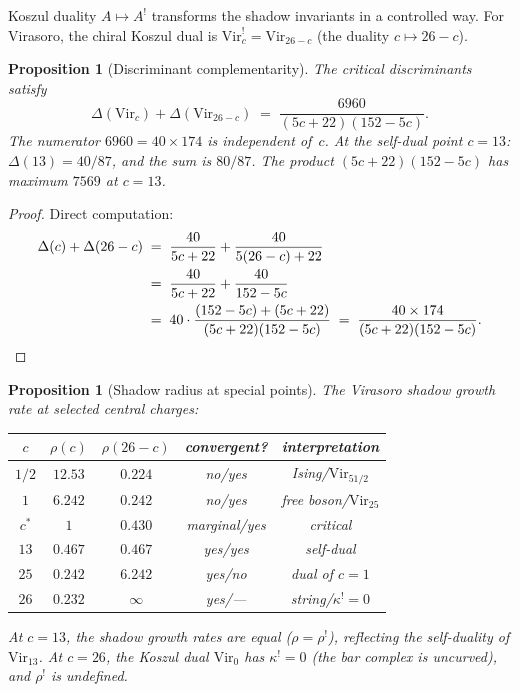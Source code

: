 \documentclass[11pt]{article}
\theoremstyle{plain}
\newtheorem{proposition}[theorem]{Proposition}
\theoremstyle{definition}
\theoremstyle{remark}
\begin{document}
Koszul duality $A \mapsto A^{!}$ transforms the shadow
invariants in a controlled way. For Virasoro, the chiral
Koszul dual is $\mathrm{Vir}_c^{!} = \mathrm{Vir}_{26-c}$
(the duality $c \mapsto 26 - c$).

\begin{proposition}[Discriminant complementarity]
\label{prop:complementarity}
The critical discriminants satisfy
\begin{equation}\label{eq:complementarity}
 \Delta(\mathrm{Vir}_c) + \Delta(\mathrm{Vir}_{26-c})
 \;=\;
 \frac{6960}{(5c+22)(152-5c)}.
\end{equation}
The numerator $6960 = 40 \times 174$ is independent of~$c$.
At the self-dual point $c = 13$:
$\Delta(13) = 40/87$, and the sum is $80/87$.
The product $(5c+22)(152-5c)$ has maximum $7569$ at $c = 13$.
\end{proposition}

\begin{proof}
Direct computation:
\begin{align*}
 \Delta(c) + \Delta(26-c)
 &\;=\;
 \frac{40}{5c+22} + \frac{40}{5(26-c)+22} \\
 &\;=\;
 \frac{40}{5c+22} + \frac{40}{152-5c} \\
 &\;=\;
 40\cdot\frac{(152-5c)+(5c+22)}{(5c+22)(152-5c)}
 \;=\;
 \frac{40 \times 174}{(5c+22)(152-5c)}.
 \qedhere
\end{align*}
\end{proof}

\begin{proposition}[Shadow radius at special points]
\label{prop:special-radii}
The Virasoro shadow growth rate at selected central
charges:
\begin{center}
\renewcommand{\arraystretch}{1.2}
\begin{tabular}{ccccc}
\toprule
$c$ & $\rho(c)$ & $\rho(26{-}c)$ &
 convergent? & interpretation \\
\midrule
$1/2$ & $12.53$ & $0.224$ & no/yes &
 Ising/$\mathrm{Vir}_{51/2}$ \\
$1$ & $6.242$ & $0.242$ & no/yes &
 free boson/$\mathrm{Vir}_{25}$ \\
$c^*$ & $1$ & $0.430$ & marginal/yes &
 critical \\
$13$ & $0.467$ & $0.467$ & yes/yes &
 self-dual \\
$25$ & $0.242$ & $6.242$ & yes/no &
 dual of $c{=}1$ \\
$26$ & $0.232$ & $\infty$ & yes/--- &
 string/$\kappa^{!}{=}0$ \\
\bottomrule
\end{tabular}
\end{center}
At $c = 13$, the shadow growth rates are equal
($\rho = \rho^{!}$), reflecting the self-duality of
$\mathrm{Vir}_{13}$. At $c = 26$, the Koszul dual
$\mathrm{Vir}_0$ has $\kappa^{!} = 0$ (the bar complex
is uncurved), and $\rho^{!}$ is undefined.
\end{proposition}
\end{document}
